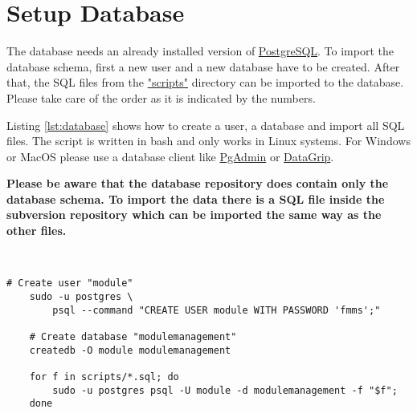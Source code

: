 \chapter{Setup Database}
\label{ch:database}

The database needs an already installed version of \href{https://www.postgresql.org/}{PostgreSQL}.
To import the database schema, first a new user and a new database have to be created.
After that, the SQL files from the \href{https://github.com/FSG1/database/tree/master/scripts}{"scripts"} directory can be imported to the database. Please take care of the order as it is indicated by the numbers.

Listing \ref{lst:database} shows how to create a user, a database and import all SQL files.
The script is written in bash and only works in Linux systems.
For Windows or MacOS please use a database client like \href{https://www.pgadmin.org/}{PgAdmin} or \href{https://www.jetbrains.com/datagrip/}{DataGrip}.

\textbf{Please be aware that the database repository does contain only the database schema. To import the data there is a SQL file inside the subversion repository which can be imported the same way as the other files.}

~\\
\begin{minipage}{\textwidth}
	\begin{lstlisting}[caption={Import database schema},label={lst:database}]
	# Create user "module"
	sudo -u postgres \
		psql --command "CREATE USER module WITH PASSWORD 'fmms';"
	
	# Create database "modulemanagement"
	createdb -O module modulemanagement
	
	for f in scripts/*.sql; do 
		sudo -u postgres psql -U module -d modulemanagement -f "$f";
	done
	\end{lstlisting}
\end{minipage}

